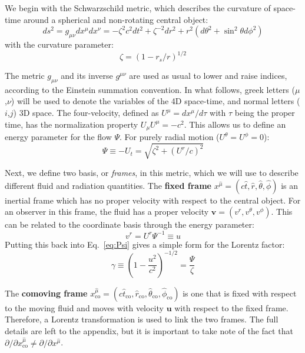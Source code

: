 \documentclass[../main.tex]{subfiles}
\begin{document}
We begin with the Schwarzschild metric, which describes the curvature of space-time around a spherical and non-rotating central object:
\begin{equation}
ds^2=g_{\mu\nu}dx^\mu dx^\nu=-\zeta^2 c^2dt^2+\zeta^{-2}dr^2 +r^2(d\theta^2+\sin^2\theta d\phi^2)
\end{equation}
with the curvature parameter:
\begin{equation}
    \zeta=(1-r_s/r)^{1/2}
\end{equation}

The metric $g_{\mu\nu}$ and its inverse $g^{\mu\nu}$ are used as usual to lower and raise indices, according to the Einstein summation convention.  In what follows, greek letters ($\mu$,$\nu$) will be used to denote the variables of the 4D space-time, and normal letters ($i$,$j$) 3D space.  The four-velocity, defined as $U^\mu=dx^\mu/d\tau$ with $\tau$ being the proper time, has the normalization property $U_\mu U^\mu=-c^2$.  This allows us to define an energy parameter for the flow $\Psi$.  For purely radial motion ($U^\theta=U^\phi=0$):
\begin{equation}\label{eq:Psi}
    \Psi\equiv -U_t=\sqrt{\zeta^2+(U^r/c)^2}
\end{equation}

Next, we define two basis, or \textit{frames}, in this metric, which we will use to describe different fluid and radiation quantities.  The \textbf{fixed frame} $x^{\hat{\mu}}=(c\hat{t},\hat{r},\hat{\theta},\hat{\phi})$ is an inertial frame which has no proper velocity with respect to the central object.  For an observer in this frame, the fluid has a proper velocity $\bm{v}=(v^r,v^\theta,v^\phi)$.  This can be related to the coordinate basis through the energy parameter:
\begin{equation}
    v^r=U^r\Psi^{-1}\equiv u
\end{equation}
Putting this back into Eq.~\eqref{eq:Psi} gives a simple form for the Lorentz factor:
\begin{equation}\label{eq:gamma}
\gamma\equiv\left(1-\frac{u^2}{c^2}\right)^{-1/2}=\frac{\Psi}{\zeta}
\end{equation}

The \textbf{comoving frame} $x^{\hat{\mu}}_\text{co}=(c\hat{t}_\text{co},\hat{r}_\text{co},\hat{\theta}_\text{co},\hat{\phi}_\text{co})$ is one that is fixed with respect to the moving fluid and moves with velocity $\bm{u}$ with respect to the fixed frame.  Therefore, a Lorentz transformation is used to link the two frames.  The full details are left to the appendix, but it is important to take note of the fact that $\partial/\partial x_\text{co}^{\hat{\mu}}\neq \partial/\partial x^{\hat{\mu}}$.\\
\end{document}
